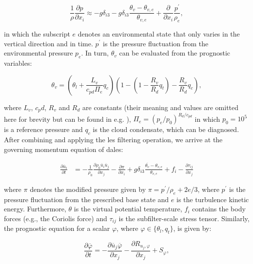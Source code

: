 \begin{equation}
    \frac{1}{\rho} \frac{\partial p}{\partial x_i} \approx - g \delta_{i3} - g \delta_{i3} \frac{\theta_v - \theta_{v,e}}{\theta_{v,e}} + \frac{\partial}{\partial x_i} \frac{p^\prime}{\rho_e}, \label{eq:pressure_grad}
\end{equation}

in which the subscript $e$ denotes an environmental state that only varies in the vertical direction and in time. $p^\prime$ is the pressure fluctuation from the environmental pressure $p_e$. In turn, $\theta_v$ can be evaluated from the prognostic variables:

\begin{equation}
    \theta_v = \left( \theta_l + \frac{L_v}{c_{pd} \Pi_e} q_c \right) \left( 1 - \left( 1 - \frac{R_v}{R_d} q_t \right) - \frac{R_v}{R_d} q_c \right), \label{eq:theta_v} 
\end{equation}

where $L_v$, $c_pd$, $R_v$ and $R_d$ are constants (their meaning and values are omitted here for brevity but can be found in e.g. \citet{stullIntroductionBoundaryLayer1988}), $\Pi_e = (p_e/p_0)^{R_d/c_{pd}}$ in which $p_0=10^5$ is a reference pressure and $q_c$ is the cloud condensate, which can be diagnosed. After combining  and applying the \acrshort{les} filtering operation, we arrive at the governing momentum equation of \acrshort{dales}:

\begin{align}
    \frac{\partial \overline{u}_i}{\partial t} &= - \frac{1}{\rho_0} \frac{\partial \rho_0 \overline{u}_i \overline{u}_j}{\partial x_j} - \frac{\partial \pi}{\partial x_i} + g \delta_{i3} \frac{\overline{\theta_v} - \theta_{v,e}}{\theta_{v,e}} + f_i - \frac{\partial \tau_{ij}}{\partial x_j} \label{eq:momentum_conservation}
\end{align}

where $\pi$ denotes the modified pressure given by $\pi = p^\prime/\rho_e + 2e/3$, where $p^\prime$ is the pressure fluctuation from the prescribed base state and $e$ is the turbulence kinetic energy. Furthermore, $\theta$ is the virtual potential temperature, $f_i$ contains the body forces (e.g., the Coriolis force) and $\tau_{ij}$ is the subfilter-scale stress tensor. Similarly, the prognostic equation for a scalar $\varphi$, where $\varphi \in \{\theta_l, q_t\}$, is given by:

\begin{equation}
    \frac{\partial \overline{\varphi}}{\partial t} = - \frac{\partial \overline{u}_j \overline{\varphi}}{\partial x_j} - \frac{\partial R_{u_j,\varphi}}{\partial x_j} + S_\varphi,
\end{equation}

